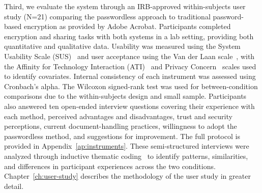 Third, we evaluate the system through an IRB-approved within-subjects user study (N=21) comparing the passwordless approach to traditional password-based encryption as provided by Adobe Acrobat. Participants completed encryption and sharing tasks with both systems in a lab setting, providing both quantitative and qualitative data. Usability was measured using the System Usability Scale (SUS)~\cite{brooke_sus_1996} and user acceptance using the Van der Laan scale~\cite{vanderlaan_simple_1997}, with the Affinity for Technology Interaction (ATI)~\cite{franke_personal_2019} and Privacy Concern~\cite{langer_information_2018} scales used to identify covariates. Internal consistency of each instrument was assessed using Cronbach's alpha. The Wilcoxon signed-rank test was used for between-condition comparisons due to the within-subjects design and small sample. Participants also answered ten open-ended interview questions covering their experience with each method, perceived advantages and disadvantages, trust and security perceptions, current document-handling practices, willingness to adopt the passwordless method, and suggestions for improvement. The full protocol is provided in Appendix~\ref{ap:instruments}. These semi-structured interviews were analyzed through inductive thematic coding~\cite{braun_thematic_2006} to identify patterns, similarities, and differences in participant experiences across the two conditions. Chapter~\ref{ch:user-study} describes the methodology of the user study in greater detail.
